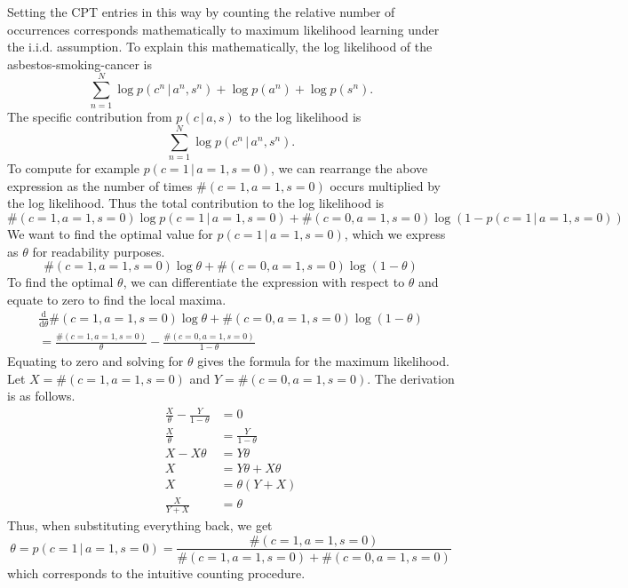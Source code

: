 \documentclass{article}
\newcommand{\giv}{\,|\,}
\begin{document}
\noindent Setting the CPT entries in this way by counting the relative number of occurrences corresponds mathematically to maximum likelihood learning under the i.i.d. assumption. To explain this mathematically, the log likelihood of the asbestos-smoking-cancer is 
$$
    \sum_{n=1}^N \log p(c^n \giv a^n, s^n) + \log p(a^n) + \log p(s^n) . 
$$
\noindent The specific contribution from $p(c \giv a, s)$ to the log likelihood is 
$$
    \sum_{n=1}^N \log p(c^n \giv a^n, s^n). 
$$
\noindent To compute for example $p(c = 1 \giv a = 1, s = 0)$, we can rearrange the above expression as the number of times $\#(c = 1, a = 1, s = 0)$ occurs multiplied by the log likelihood. Thus the total contribution to the log likelihood is
$$
    \#(c = 1, a = 1, s = 0) \log p(c = 1 \giv a = 1, s = 0) + \#(c = 0, a = 1, s = 0) \log( 1 - p(c = 1 \giv a = 1, s = 0))
$$
\noindent We want to find the optimal value for $p(c = 1 \giv a = 1, s = 0)$, which we express as $\theta$ for readability purposes. 
$$
    \#(c = 1, a = 1, s = 0) \log \theta + \#(c = 0, a = 1, s = 0) \log( 1 - \theta)
$$
\noindent To find the optimal $\theta$, we can differentiate the expression with respect to $\theta$ and equate to zero to find the local maxima. 
\begin{align*}
    \frac{\text{d}}{\text{d} \theta} \#(c = 1, a = 1, s = 0) \log \theta + \#(c = 0, a = 1, s = 0) \log( 1 - \theta) \\[1em]
    = \frac{\#(c = 1, a = 1, s = 0)}{\theta} - \frac{\#(c = 0, a = 1, s = 0)}{1-\theta}
\end{align*}
\noindent Equating to zero and solving for $\theta$ gives the formula for the maximum likelihood. Let $X = \#(c = 1, a = 1, s = 0)$ and $Y = \#(c = 0, a = 1, s = 0)$. The derivation is as follows. 
\begin{align*}
    \frac{X}{\theta} - \frac{Y}{1-\theta} &= 0\\
    \frac{X}{\theta} &= \frac{Y}{1-\theta}\\
    X - X \theta &= Y\theta \\
    X &= Y\theta + X \theta \\
    X &= \theta (Y + X) \\
    \frac{X}{Y+X} &= \theta    
\end{align*}
\noindent Thus, when substituting everything back, we get
$$
    \theta = p(c = 1 \giv a = 1, s = 0) = \frac{\#(c = 1, a = 1, s = 0)}{\#(c = 1, a = 1, s = 0) + \#(c = 0, a = 1, s = 0)}
$$
\noindent which corresponds to the intuitive counting procedure. 
\end{document}
